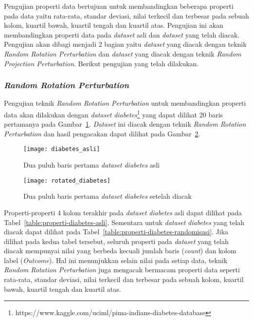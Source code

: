Pengujian properti data bertujuan untuk membandingkan beberapa properti pada data yaitu rata-rata, standar deviasi, nilai terkecil dan terbesar pada sebuah kolom, kuartil bawah, kuartil tengah dan kuartil atas. Pengujian ini akan membandingkan properti data pada \textit{dataset} asli dan \textit{dataset} yang telah diacak. Pengujian akan dibagi menjadi 2 bagian yaitu \textit{dataset} yang diacak dengan teknik \textit{Random Rotation Perturbation} dan \textit{dataset} yang diacak dengan teknik \textit{Random Projection Perturbation}. Berikut pengujian yang telah dilakukan.

\subsubsection{\textit{Random Rotation Perturbation}}
\label{subsubsec:pengujian-properti-rrp}

Pengujian teknik \textit{Random Rotation Perturbation} untuk membandingkan properti data akan dilakukan dengan \textit{dataset} \textit{diabetes}\footnote{https://www.kaggle.com/uciml/pima-indians-diabetes-database} yang dapat dilihat 20 baris pertamanya pada Gambar~\ref{fig:diabetes_asli}. \textit{Dataset} ini diacak dengan teknik \textit{Random Rotation Perturbation} dan hasil pengacakan dapat dilihat pada Gambar~\ref{fig:rotated_diabetes}.

\begin{figure}
	\centering
	\texttt{[image: diabetes\_asli]}
	\caption{Dua puluh baris pertama \textit{dataset} \textit{diabetes} asli}
	\label{fig:diabetes_asli}
\end{figure}

\begin{figure}
	\centering
	\texttt{[image: rotated\_diabetes]}
	\caption{Dua puluh baris pertama \textit{dataset} \textit{diabetes} setelah diacak}
	\label{fig:rotated_diabetes}
\end{figure}

Properti-properti 4 kolom terakhir pada \textit{dataset} \textit{diabetes} asli dapat dilihat pada Tabel~\ref{table:properti-diabetes-asli}. Sementara untuk \textit{dataset} \textit{diabetes} yang telah diacak dapat dilihat pada Tabel~\ref{table:properti-diabetes-randomisasi}. Jika dilihat pada kedua tabel tersebut, seluruh properti pada \textit{dataset} yang telah diacak mempunyai nilai yang berbeda kecuali jumlah baris (\textit{count}) dan kolom label (\textit{Outcome}). Hal ini menunjukkan selain nilai pada setiap data, teknik \textit{Random Rotation Perturbation} juga mengacak bermacam properti data seperti rata-rata, standar deviasi, nilai terkecil dan terbesar pada sebuah kolom, kuartil bawah, kuartil tengah dan kuartil atas.
	
